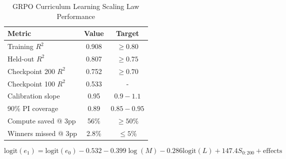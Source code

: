 \begin{table}[h]
\centering
\caption{GRPO Curriculum Learning Scaling Law Performance}
\begin{tabular}{lcc}
\toprule
Metric & Value & Target \\
\midrule
Training $R^2$ & 0.908 & $\geq 0.80$ \\
Held-out $R^2$ & 0.807 & $\geq 0.75$ \\
Checkpoint 200 $R^2$ & 0.752 & $\geq 0.70$ \\
Checkpoint 100 $R^2$ & 0.533 & - \\
Calibration slope & 0.95 & $0.9-1.1$ \\
90\% PI coverage & 0.89 & $0.85-0.95$ \\
Compute saved @ 3pp & 56\% & $\geq 50\%$ \\
Winners missed @ 3pp & 2.8\% & $\leq 5\%$ \\
\bottomrule
\end{tabular}
\end{table}

\begin{equation}
\text{logit}(e_1) = \text{logit}(e_0) - 0.532 - 0.399\log(M) - 0.286\text{logit}(L) + 147.4 S_{0:200} + \text{effects}
\end{equation}

